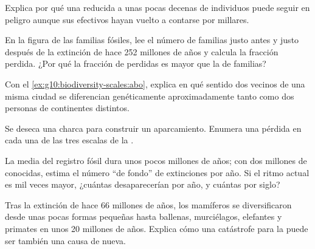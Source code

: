 \begin{exercise}[$\star\star$]\label{exo:g10:biodiversity-scales:8}
Explica por qué una  reducida a unas pocas decenas de
individuos puede seguir en peligro aunque sus efectivos hayan vuelto a
contarse por millares.
\end{exercise}

\begin{exercise}[$\star\star$]\label{exo:g10:biodiversity-scales:9}
En la figura de las familias fósiles, lee el número de familias justo
antes y justo después de la extinción de hace 252 millones de años y
calcula la fracción perdida. ¿Por qué la fracción de \emph{}
perdidas es mayor que la de familias?
\end{exercise}

\begin{exercise}[$\star\star$]\label{exo:g10:biodiversity-scales:10}
Con el \cref{ex:g10:biodiversity-scales:abo}, explica en qué sentido
dos vecinos de una misma ciudad se diferencian genéticamente
aproximadamente tanto como dos personas de continentes distintos.
\end{exercise}

\begin{exercise}[$\star\star$]\label{exo:g10:biodiversity-scales:11}
Se deseca una charca para construir un aparcamiento. Enumera una
pérdida en cada una de las tres escalas de la .
\end{exercise}

\begin{exercise}[$\star\star\star$]\label{exo:g10:biodiversity-scales:12}
La  media del registro fósil dura unos pocos millones de años;
con dos millones de  conocidas, estima el número ``de fondo''
de extinciones por año. Si el ritmo actual es mil veces mayor,
¿cuántas  desaparecerían por año, y cuántas por siglo?
\end{exercise}

\begin{exercise}[$\star\star\star$]\label{exo:g10:biodiversity-scales:13}
Tras la extinción de hace 66 millones de años, los mamíferos se
diversificaron desde unas pocas formas pequeñas hasta ballenas,
murciélagos, elefantes y primates en unos 20 millones de años. Explica
cómo una catástrofe para la  puede ser también una causa
de  nueva.
\end{exercise}

